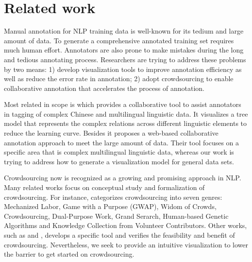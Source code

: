 \section{Related work}

Manual annotation for NLP training data is well-known for its tedium
and large amount of data. To generate a comprehensive annotated
training set requires much human effort. Annotators are also prone to
make mistakes during the long and tedious annotating process.
Researchers are trying to address these problems by two means: 1)
develop visualization tools to improve annotation efficiency as well
as reduce the error rate in annotation; 2) adopt crowdsourcing to
enable collaborative annotation that accelerates the process of
annotation.

Most related in scope is \cite{yan2012collaborative} which provides a
collaborative tool to assist annotators in tagging of complex Chinese
and multilingual linguistic data. It visualizes a tree model that
represents the complex relations across different linguistic elements
to reduce the learning curve. Besides it proposes a web-based
collaborative annotation approach to meet the large amount of data.
Their tool focuses on a specific area that is complex multilingual
linguistic data, whereas our work is trying to address how to generate
a visualization model for general data sets.

Crowdsourcing now is recognized as a growing and promising approach in
NLP. Many related works focus on conceptual study and formalization of
crowdsourcing. For instance, \cite{quinn2009taxonomy} categorizes
crowdsourcing into seven genres: Mechanized Labor, Game with a Purpose
(GWAP), Widom of Crowds, Crowdsourcing, Dual-Purpose Work, Grand
Serarch, Human-based Genetic Algorithms and Knowledge Collection from
Volunteer Contributors. Other works, such as
\cite{abekawa2010community} and \cite{irvine2010using}, develops a
specific tool and verifies the feasibility and benefit of
crowdsourcing. Nevertheless, we seek to provide an intuitive
visualization to lower the barrier to get started on crowdsourcing. 

